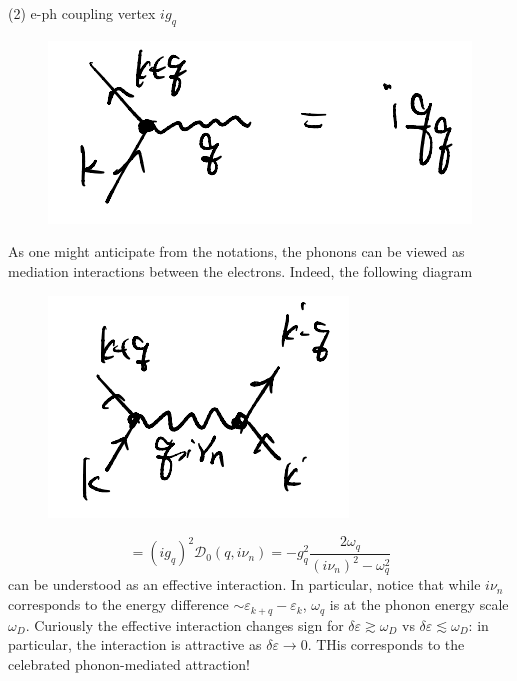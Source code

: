 (2) e-ph coupling vertex $ig_q$
\begin{figure}[H]
    \centering
    \includegraphics{jupyterbook/data/fig/lec23-fig01.png}
\end{figure}
As one might anticipate from the notations, the phonons can be viewed as mediation interactions between the electrons. Indeed, the following diagram
\begin{figure}[H]
    \centering
    \includegraphics{jupyterbook/data/fig/lec23-fig02.png}
\end{figure}
\[=\left( ig_q \right) ^2\mathscr{D} _0\left( q,i\nu _n \right) =-g_{q}^{2}\frac{2\omega _q}{\left( i\nu _n \right) ^2-\omega _{q}^{2}}\]
can be understood as an effective interaction. In particular, notice that while $i\nu_n$ corresponds to the energy difference $\sim\varepsilon_{k+q}-\varepsilon_k$, $\omega_q$ is at the phonon energy scale $\omega_D$. Curiously the effective interaction changes sign for $\delta\varepsilon \gtrsim \omega_D$ vs $\delta\varepsilon \lesssim \omega_D$: in particular, the interaction is attractive as $\delta \varepsilon\to 0$. THis corresponds to the celebrated phonon-mediated attraction!

